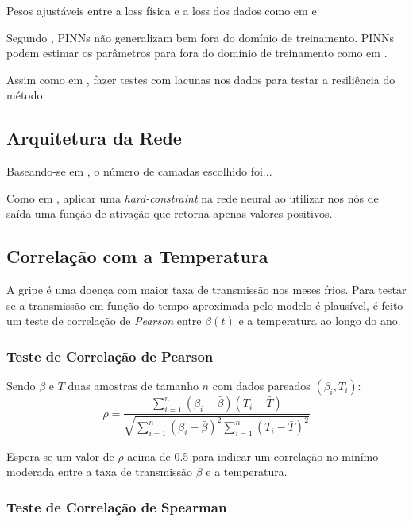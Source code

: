 Pesos ajustáveis entre a loss física e a loss dos dados como em 
\cite{long-etal:21-L2} e 
\cite{shamsara-etal:25-omicron}

Segundo \cite{bonfanti-etal:24-generalizacao-pinns}, PINNs não generalizam bem
fora do domínio de treinamento. PINNs podem estimar os parâmetros para fora
do domínio de treinamento como em \cite{millevoi-etal:24-split-join-pinns}.

Assim como em \cite{ghosh-etal:23-subnotificacao}, fazer testes com lacunas
nos dados para testar a resiliência do método.

\subsection{Arquitetura da Rede}

Baseando-se em \cite{shaier-etal:22-dinns}, o número de camadas escolhido foi...

Como em \cite{millevoi-etal:24-split-join-pinns}, aplicar uma 
\textit{hard-constraint} na rede neural ao utilizar nos nós de saída
uma função de ativação que retorna apenas valores positivos.

\subsection{Correlação com a Temperatura}

A gripe é uma doença com maior taxa de transmissão nos meses frios. 
Para testar se a transmissão em função do tempo aproximada pelo modelo é plausível,
é feito um teste de correlação de \textit{Pearson} entre $\beta(t)$ e a temperatura
ao longo do ano.

\subsubsection{Teste de Correlação de Pearson}

Sendo $\beta$ e $T$ duas amostras de tamanho $n$ com dados pareados $(\beta_i, T_i)$:
\begin{equation}\label{correlacao-de-pearson}
\rho = \frac{\sum_{i=1}^{n} (\beta_i - \bar{\beta})(T_i - \bar{T})}{\sqrt{\sum_{i=1}^{n} (\beta_i - \bar{\beta})^2 \sum_{i=1}^{n} (T_i - \bar{T})^2}}
\end{equation}

Espera-se um valor de $\rho$ acima de 0.5 para indicar um correlação no minímo moderada
entre a taxa de transmissão $\beta$ e a temperatura.

\subsubsection{Teste de Correlação de Spearman}

